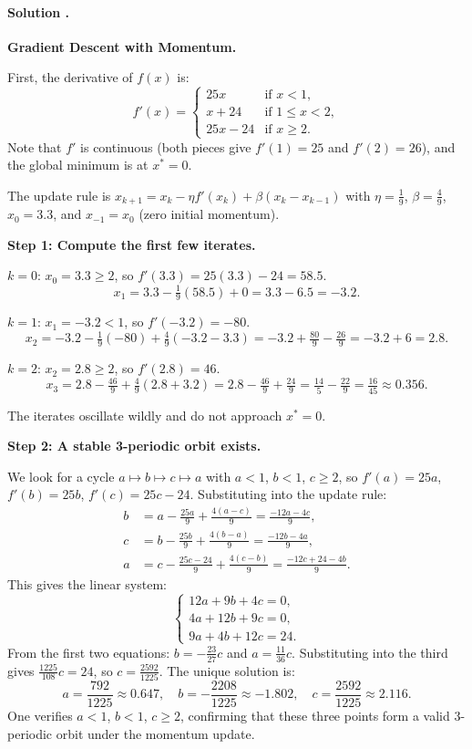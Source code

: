 \documentclass{article}
\newcounter{solutionCount}
\newcommand{\solution}[1]{
    \stepcounter{solutionCount}
    \paragraph{Solution \thesolutionCount.}
    {
        #1
    }
}
\begin{document}
\solution{
    \textbf{Gradient Descent with Momentum.}

    First, the derivative of $f(x)$ is:
    \[
    f'(x) = \begin{cases}
    25x & \text{if } x < 1, \\
    x + 24 & \text{if } 1 \le x < 2, \\
    25x - 24 & \text{if } x \ge 2.
    \end{cases}
    \]
    Note that $f'$ is continuous (both pieces give $f'(1)=25$ and $f'(2)=26$), and the global minimum is at $x^* = 0$.

    The update rule is $x_{k+1} = x_k - \eta f'(x_k) + \beta(x_k - x_{k-1})$ with $\eta = \frac{1}{9}$, $\beta = \frac{4}{9}$, $x_0 = 3.3$, and $x_{-1} = x_0$ (zero initial momentum).

    \medskip
    \textbf{Step 1: Compute the first few iterates.}

    $k=0$: $x_0 = 3.3 \ge 2$, so $f'(3.3) = 25(3.3)-24 = 58.5$.
    \[
    x_1 = 3.3 - \tfrac{1}{9}(58.5) + 0 = 3.3 - 6.5 = -3.2.
    \]

    $k=1$: $x_1 = -3.2 < 1$, so $f'(-3.2) = -80$.
    \[
    x_2 = -3.2 - \tfrac{1}{9}(-80) + \tfrac{4}{9}(-3.2 - 3.3) = -3.2 + \tfrac{80}{9} - \tfrac{26}{9} = -3.2 + 6 = 2.8.
    \]

    $k=2$: $x_2 = 2.8 \ge 2$, so $f'(2.8) = 46$.
    \[
    x_3 = 2.8 - \tfrac{46}{9} + \tfrac{4}{9}(2.8+3.2) = 2.8 - \tfrac{46}{9} + \tfrac{24}{9} = \tfrac{14}{5} - \tfrac{22}{9} = \tfrac{16}{45} \approx 0.356.
    \]

    The iterates oscillate wildly and do not approach $x^* = 0$.

    \medskip
    \textbf{Step 2: A stable 3-periodic orbit exists.}

    We look for a cycle $a \mapsto b \mapsto c \mapsto a$ with $a < 1$, $b < 1$, $c \ge 2$, so $f'(a)=25a$, $f'(b)=25b$, $f'(c)=25c-24$. Substituting into the update rule:
    \begin{align*}
    b &= a - \tfrac{25a}{9} + \tfrac{4(a-c)}{9} = \tfrac{-12a - 4c}{9}, \\
    c &= b - \tfrac{25b}{9} + \tfrac{4(b-a)}{9} = \tfrac{-12b - 4a}{9}, \\
    a &= c - \tfrac{25c-24}{9} + \tfrac{4(c-b)}{9} = \tfrac{-12c + 24 - 4b}{9}.
    \end{align*}
    This gives the linear system:
    \[
    \begin{cases}
    12a + 9b + 4c = 0, \\
    4a + 12b + 9c = 0, \\
    9a + 4b + 12c = 24.
    \end{cases}
    \]
    From the first two equations: $b = -\frac{23}{27}c$ and $a = \frac{11}{36}c$. Substituting into the third gives $\frac{1225}{108}c = 24$, so $c = \frac{2592}{1225}$. The unique solution is:
    \[
    a = \frac{792}{1225} \approx 0.647, \quad
    b = -\frac{2208}{1225} \approx -1.802, \quad
    c = \frac{2592}{1225} \approx 2.116.
    \]
    One verifies $a < 1$, $b < 1$, $c \ge 2$, confirming that these three points form a valid 3-periodic orbit under the momentum update.

}
\end{document}
